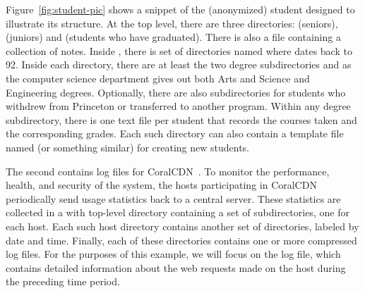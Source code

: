 Figure~\ref{fig:student-pic} shows a snippet
of the (anonymized) student \filestore{} designed to
illustrate its structure.  At the top level, there are
three directories: 
 (seniors),
 (juniors)
and 
 (students who have graduated).
There is also a  file containing a collection of notes.
Inside , there is set of directories named 
 where  dates back to 92.  Inside each  
directory, there are at least the 
two degree subdirectories  and  as
the computer science department gives out both Arts and Science
and Engineering degrees.  Optionally, there are also subdirectories for
students who withdrew from Princeton or transferred to another program. 
Within any degree subdirectory, there is one text file
per student that records the courses taken and the corresponding grades.
Each such directory can also contain a 
template file named  (or something similar) for creating
new students.



The second \filestore{} contains log files for 
CoralCDN~\cite{freedman+:coral,freedman:coral-experience}. To
monitor the performance, health, and security of the system, the hosts
participating in CoralCDN periodically send usage statistics back to
a central server. These statistics are collected in a \filestore{}
with top-level  directory containing a set of subdirectories, one
for each host. Each such host directory contains another set of
directories, labeled by date and time. Finally, each of these
directories contains one or more compressed log files. For the
purposes of this example, we will focus on the 
log file, which contains detailed information about the web requests
made on the host during the preceding time period.

